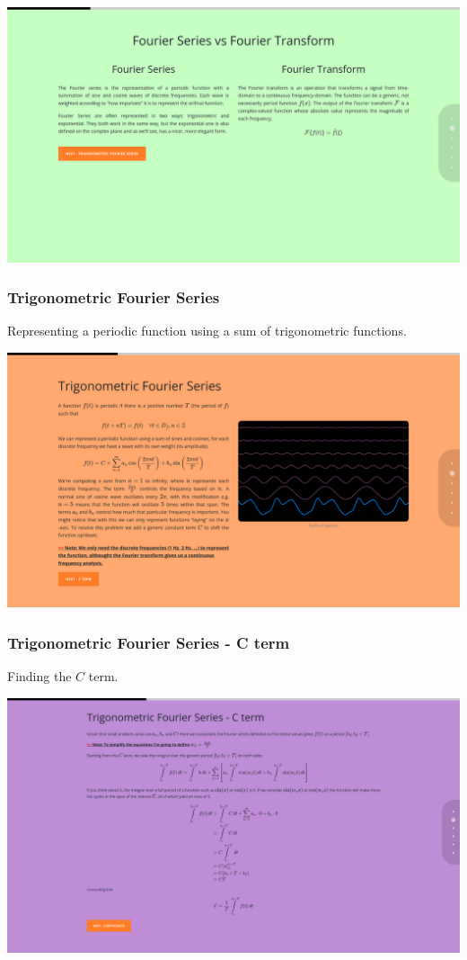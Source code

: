 \documentclass{article}
\begin{document}
\includegraphics[width=\textwidth]{chap4.png}

\subsubsection{Trigonometric Fourier Series}

Representing a periodic function using a sum of trigonometric functions.

\includegraphics[width=\textwidth]{chap5.png}

\subsubsection{Trigonometric Fourier Series - C term}

Finding the \(C\) term.

\includegraphics[width=\textwidth]{chap6.png}
\end{document}
